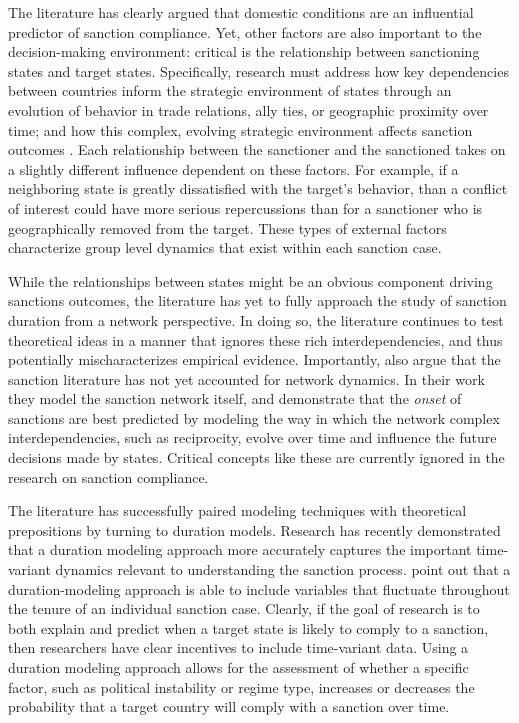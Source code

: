 
The literature has clearly argued that domestic conditions are an influential predictor of sanction compliance. Yet, other factors are also important to the decision-making environment: critical is the relationship between sanctioning states and target states. Specifically, research must address how key dependencies between countries inform the strategic environment of states through an evolution of behavior in trade relations, ally ties, or geographic proximity over time; and how this complex, evolving strategic environment affects sanction outcomes \citep{mclean2010friends}. Each relationship between the sanctioner and the sanctioned takes on a slightly different influence dependent on these factors. For example, if a neighboring state is greatly dissatisfied with the target's behavior, than a conflict of interest could have more serious repercussions than for a sanctioner who is geographically removed from the target. These types of external factors characterize group level dynamics that exist within each sanction case. 

While the relationships between states might be an obvious component driving sanctions outcomes, the literature has yet to fully approach the study of sanction duration from a network perspective. In doing so, the literature continues to test theoretical ideas in a manner that ignores these rich interdependencies, and thus potentially mischaracterizes empirical evidence. Importantly, \citet{cranmer2014reciprocity} also argue that the sanction literature has not yet accounted for network dynamics. In their work they model the sanction network itself, and demonstrate that the \textit{onset} of sanctions are best predicted by modeling the way in which the network complex interdependencies, such as reciprocity, evolve over time and influence the future decisions made by states. Critical concepts like these are currently ignored in the research on sanction compliance. 

The literature has successfully paired modeling techniques with theoretical prepositions by turning to duration models. Research has recently demonstrated that a duration modeling approach more accurately captures the important time-variant dynamics relevant to understanding the sanction process. \cite{bolks2000} point out that a duration-modeling approach is able to include variables that fluctuate throughout the tenure of an individual sanction case. Clearly, if the goal of research is to both explain and predict when a target state is likely to comply to a sanction, then researchers have clear incentives to include time-variant data. Using a duration modeling approach allows for the assessment of whether a specific factor, such as political instability or regime type, increases or decreases the probability that a target country will comply with a sanction over time.


